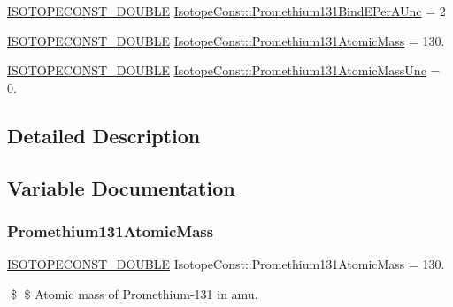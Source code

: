 \begin{DoxyCompactItemize}
\mbox{\hyperlink{group___isotope_const-_macros_ga8f45a7272ce02c0b4c65c44636ed719a}{I\+S\+O\+T\+O\+P\+E\+C\+O\+N\+S\+T\+\_\+\+D\+O\+U\+B\+LE}} \mbox{\hyperlink{group___isotope_const-_promethium-_pm131_gae15d59d03913161bdb0f02b85f0278fb}{Isotope\+Const\+::\+Promethium131\+Bind\+E\+Per\+A\+Unc}} = 2
\item 
\mbox{\hyperlink{group___isotope_const-_macros_ga8f45a7272ce02c0b4c65c44636ed719a}{I\+S\+O\+T\+O\+P\+E\+C\+O\+N\+S\+T\+\_\+\+D\+O\+U\+B\+LE}} \mbox{\hyperlink{group___isotope_const-_promethium-_pm131_ga812eab2ac41f07ad85ab68bf4571f6cb}{Isotope\+Const\+::\+Promethium131\+Atomic\+Mass}} = 130.
\item 
\mbox{\hyperlink{group___isotope_const-_macros_ga8f45a7272ce02c0b4c65c44636ed719a}{I\+S\+O\+T\+O\+P\+E\+C\+O\+N\+S\+T\+\_\+\+D\+O\+U\+B\+LE}} \mbox{\hyperlink{group___isotope_const-_promethium-_pm131_ga190e6e8c742fe22d6282ffb34d41d091}{Isotope\+Const\+::\+Promethium131\+Atomic\+Mass\+Unc}} = 0.
\end{DoxyCompactItemize}


\subsection{Detailed Description}


\subsection{Variable Documentation}
\mbox{\label{group___isotope_const-_promethium-_pm131_ga812eab2ac41f07ad85ab68bf4571f6cb}} 
\subsubsection{\texorpdfstring{Promethium131\+Atomic\+Mass}{Promethium131AtomicMass}}
{\footnotesize\ttfamily \mbox{\hyperlink{group___isotope_const-_macros_ga8f45a7272ce02c0b4c65c44636ed719a}{I\+S\+O\+T\+O\+P\+E\+C\+O\+N\+S\+T\+\_\+\+D\+O\+U\+B\+LE}} Isotope\+Const\+::\+Promethium131\+Atomic\+Mass = 130.}

\$ \$ Atomic mass of Promethium-\/131 in amu. \mbox{\label{group___isotope_const-_promethium-_pm131_ga190e6e8c742fe22d6282ffb34d41d091}} 
